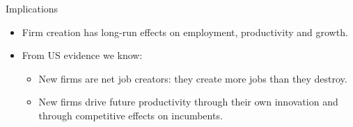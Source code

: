 \documentclass{beamer}
\begin{document}
\begin{frame}{}
\begin{columns}[t]
\begin{column}{.49\linewidth}
      \end{column}
    \end{columns}
        \begin{block}{\large Implications}
        \begin{itemize}
            \item Firm creation has long-run effects on employment, productivity and growth.
            \item From US evidence we know:
            \begin{itemize}
                \item New firms are net job creators: they create more jobs than they destroy.
                \item New firms drive future productivity through their own innovation and through competitive effects on incumbents.
            \end{itemize}  
        \end{itemize}
    \end{block}
  \end{frame}
\end{document}
